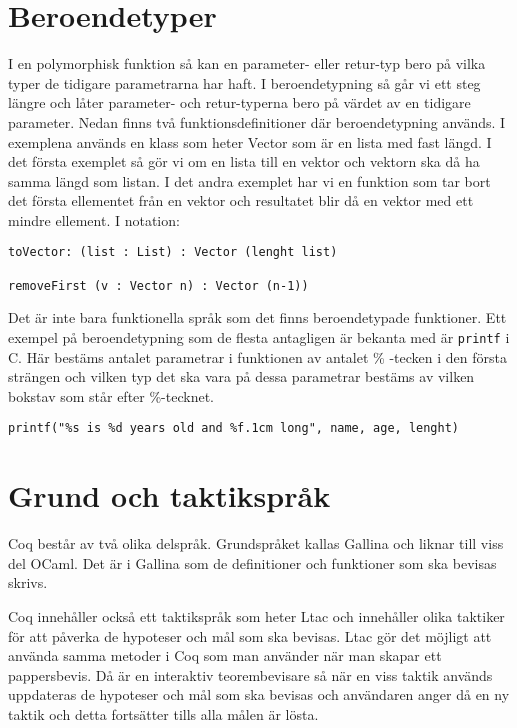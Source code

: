 \section{Beroendetyper}
I en polymorphisk funktion så kan en parameter- eller retur-typ bero på vilka
typer de tidigare parametrarna har haft. I beroendetypning så går vi ett steg
längre och låter parameter- och retur-typerna bero på värdet av en
tidigare parameter.
Nedan finns två funktionsdefinitioner där beroendetypning används.
I exemplena används en klass som heter Vector som är en lista med fast längd. I
det första exemplet så gör vi om en lista till en vektor och vektorn ska då ha
samma längd som listan. I det andra exemplet har vi en funktion som tar bort
det första ellementet från en vektor och resultatet blir då en vektor med ett
mindre ellement. I \coq notation:
\begin{verbatim}
toVector: (list : List) : Vector (lenght list)

removeFirst (v : Vector n) : Vector (n-1))
\end{verbatim}

Det är inte bara funktionella språk som det finns beroendetypade funktioner.
Ett exempel på beroendetypning som de flesta antagligen är bekanta med är
\texttt{printf} i C. Här bestäms antalet parametrar i funktionen av antalet
\% -tecken i den första strängen och vilken typ det ska vara på dessa
parametrar bestäms av vilken bokstav som står efter \%-tecknet.
\begin{verbatim}
printf("%s is %d years old and %f.1cm long", name, age, lenght)
\end{verbatim}


\section{Grund och taktikspråk}
Coq består av två olika delspråk. Grundspråket kallas Gallina och liknar till
viss del OCaml. Det är i Gallina som de definitioner och funktioner som ska
bevisas skrivs.

Coq innehåller också ett taktikspråk som heter Ltac och innehåller olika
taktiker för att påverka de hypoteser och mål som ska bevisas. Ltac gör det
möjligt att använda samma metoder i Coq som man använder när man skapar ett
pappersbevis. Då \coq är en interaktiv teorembevisare så när en viss taktik
används uppdateras de hypoteser och mål som ska bevisas och användaren
anger då en ny taktik och detta fortsätter tills alla målen är lösta.
